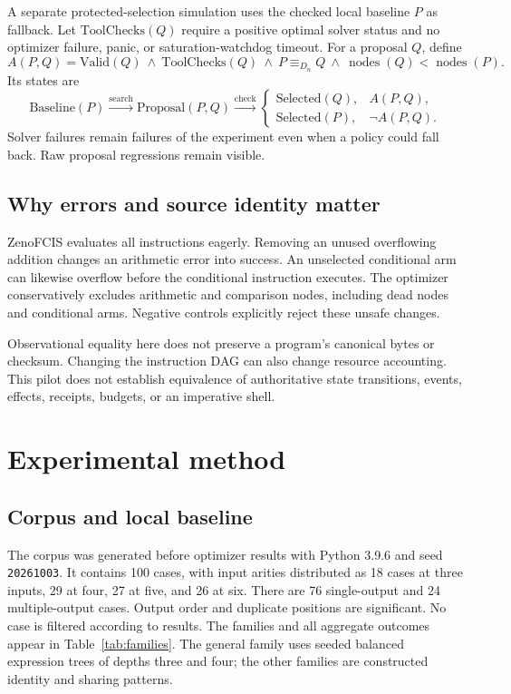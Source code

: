 \documentclass[11pt]{article}
\newcommand{\cost}{\operatorname{nodes}}
\begin{document}
A separate protected-selection simulation uses the checked local baseline
$P$ as fallback. Let $\mathrm{ToolChecks}(Q)$ require a positive optimal solver
status and no optimizer failure, panic, or saturation-watchdog timeout.
For a proposal $Q$, define
\[
 A(P,Q)=\mathrm{Valid}(Q)\ \land\ \mathrm{ToolChecks}(Q)\
   \land\ P\equiv_{D_n}Q\ \land\ \cost(Q)<\cost(P).
\]
Its states are
\[
 \mathrm{Baseline}(P)
 \xrightarrow{\mathrm{search}}\mathrm{Proposal}(P,Q)
 \xrightarrow{\mathrm{check}}
 \begin{cases}
   \mathrm{Selected}(Q),&A(P,Q),\\
   \mathrm{Selected}(P),&\neg A(P,Q).
 \end{cases}
\]
Solver failures remain failures of the experiment even when a policy could
fall back. Raw proposal regressions remain visible.

\subsection{Why errors and source identity matter}

ZenoFCIS evaluates all instructions eagerly. Removing an unused overflowing
addition changes an arithmetic error into success. An unselected conditional
arm can likewise overflow before the conditional instruction executes.
The optimizer conservatively excludes arithmetic and comparison nodes,
including dead nodes and conditional arms. Negative controls explicitly reject
these unsafe changes.

Observational equality here does not preserve a program's canonical bytes or
checksum. Changing the instruction DAG can also change resource accounting.
This pilot does not establish equivalence of authoritative state transitions,
events, effects, receipts, budgets, or an imperative shell.

\section{Experimental method}

\subsection{Corpus and local baseline}

The corpus was generated before optimizer results with Python 3.9.6 and seed
\texttt{20261003}. It contains 100 cases, with input arities distributed as
18 cases at three inputs, 29 at four, 27 at five, and 26 at six. There are
76 single-output and 24 multiple-output cases. Output order and duplicate
positions are significant. No case is filtered according to results.
The families and all aggregate outcomes appear in Table~\ref{tab:families}.
The general family uses seeded balanced expression trees of depths three and
four; the other families are constructed identity and sharing patterns.
\end{document}
